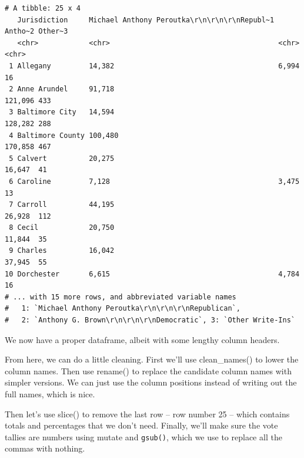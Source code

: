 \documentclass[
  letterpaper,
  DIV=11,
  numbers=noendperiod]{scrreprt}
\begin{document}
\begin{verbatim}
# A tibble: 25 x 4
   Jurisdiction     Michael Anthony Peroutka\r\n\r\n\r\nRepubl~1 Antho~2 Other~3
   <chr>            <chr>                                        <chr>   <chr>  
 1 Allegany         14,382                                       6,994   16     
 2 Anne Arundel     91,718                                       121,096 433    
 3 Baltimore City   14,594                                       128,282 288    
 4 Baltimore County 100,480                                      170,858 467    
 5 Calvert          20,275                                       16,647  41     
 6 Caroline         7,128                                        3,475   13     
 7 Carroll          44,195                                       26,928  112    
 8 Cecil            20,750                                       11,844  35     
 9 Charles          16,042                                       37,945  55     
10 Dorchester       6,615                                        4,784   16     
# ... with 15 more rows, and abbreviated variable names
#   1: `Michael Anthony Peroutka\r\n\r\n\r\nRepublican`,
#   2: `Anthony G. Brown\r\n\r\n\r\nDemocratic`, 3: `Other Write-Ins`
\end{verbatim}

We now have a proper dataframe, albeit with some lengthy column headers.

From here, we can do a little cleaning. First we'll use clean\_names()
to lower the column names. Then use rename() to replace the candidate
column names with simpler versions. We can just use the column positions
instead of writing out the full names, which is nice.

Then let's use slice() to remove the last row -- row number 25 -- which
contains totals and percentages that we don't need. Finally, we'll make
sure the vote tallies are numbers using mutate and \texttt{gsub()},
which we use to replace all the commas with nothing.
\end{document}
